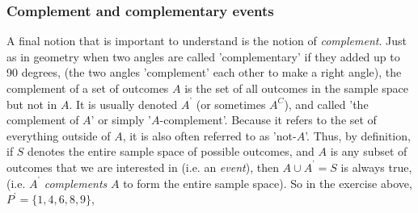             \subsubsection{ Complement and complementary events}
            \nopagebreak
            
\label{m39377*eip-442}A final notion that is important to understand is the notion
of \textsl{complement}.
Just as in geometry when two angles are called 'complementary' if they added up
to 90 degrees, (the two angles 'complement' each other to make a right angle), the complement of a set of outcomes \begin{math}A\end{math} is the set of all outcomes in the sample space but not in \begin{math}A\end{math}. It is usually denoted
\begin{math}{A}^{\text{'}}\end{math} (or sometimes \begin{math}{A}^{C}\end{math}), and called 'the complement of \begin{math}A\end{math}' or simply '\begin{math}A\end{math}-complement'. Because it refers to the set of everything outside of \begin{math}A\end{math}, it is also often referred to as 'not-\begin{math}A\end{math}'. Thus, by definition, if \begin{math}S\end{math} denotes the entire sample space of possible outcomes, and \begin{math}A\end{math} is any subset of outcomes that we are interested in (i.e. an \textsl{event}), then \begin{math}A\cup {A}^{\text{'}}=S\end{math} is always
true, (i.e. \begin{math}{A}^{\text{'}}\end{math} \textsl{complements} \begin{math}A\end{math} to form the entire
sample space). So in the exercise above, \begin{math}{P}^{\text{'}}=\{1,4,6,8,9\}\end{math},
